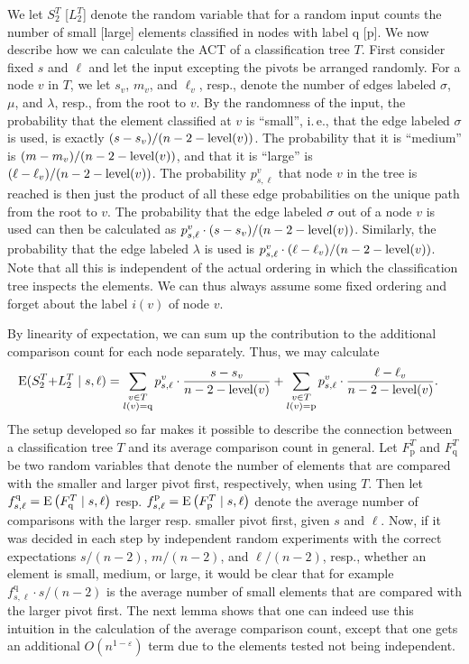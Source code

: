 \documentclass[prodmode,acmtalg]{acmsmall}
\newcommand{\E}{\textnormal{\textrm{E}}}
\begin{document}
We let $S^T_2$ [$L^T_2$] denote the random variable that for a random input
counts the number of small [large] elements classified in nodes with label
$\text{q}$ [$\text{p}$].  We now describe how we can calculate the ACT of a
classification tree $T$. First consider fixed $s$ and $\ell$ and let the input
excepting the pivots be arranged randomly.  For a node $v$ in $T$,  we let
$s_v$, $m_v$, and $\ell_v$, resp., denote the number of edges labeled $\sigma$,
$\mu$, and $\lambda$, resp., from the root to $v$. By the randomness of the
input, the probability that the element classified at $v$ is ``small'', i.\,e.,
that the edge labeled $\sigma$ is used,  is exactly $(s - s_v)/(n   - 2 -
\textnormal{\textrm{level}}(v))$. The probability that it is ``medium'' is $(m - m_v)/(n   - 2 -
\textnormal{\textrm{level}}(v))$, and that it is ``large'' is $(\ell - \ell_v)/(n - 2 - \textnormal{\textrm{level}}(v))$. The
probability $p^v_{s,\ell}$ that node $v$ in the tree is reached is then just
the product of all these edge probabilities on the unique path from the root to
$v$.  The probability that the edge labeled $\sigma$ out of a node $v$ is used
can then be calculated as $p^v_{s,\ell} \cdot (s - s_v)/(n   - 2 - \textnormal{\textrm{level}}(v))$.
Similarly, the probability that the edge labeled $\lambda$ is used is
$p^v_{s,\ell} \cdot (\ell - \ell_v)/(n   - 2 - \textnormal{\textrm{level}}(v))$. Note that all this is
independent of the actual ordering in which the classification tree inspects
the elements. We can thus always assume some fixed ordering and forget about
the label $i(v)$ of node $v$.
    
 By linearity of expectation, we can sum up the
    contribution to the additional comparison count for each node separately.
    Thus, we may calculate
   \begin{align}\label{eq:35}
    \E(S^T_2 {+} L^T_2 \mid s, \ell) &=\sum_{\substack{v \in T\\l(v) =
   \text{q}}} p^v_{s,\ell} \cdot 
\frac{s - s_v}{n
- 2 - \lv{v}} + \sum_{\substack{v \in T\\l(v) = \text{p}}} p^v_{s,\ell} \cdot \frac{\ell -
    \ell_v}{n - 2 -
    \lv{v}}.
    \end{align}
The setup developed so far makes it possible to describe the connection between a classification tree $T$ 
and its average comparison count in general. 
Let $F^T_{\text{p}}$ and $F^T_{\text{q}}$ be two random variables that denote the
number of elements that are compared
with the smaller and larger pivot first, respectively,  when using $T$. 
Then let $f^{\text{q}}_{s,\ell} = \E\left(F^T_{\text{q}} \mid s,\ell\right)$ resp. 
$f^{\text{p}}_{s,\ell} = \E\left(F^T_{\text{p}} \mid s,\ell\right)$ denote the average number of
comparisons with the larger resp. smaller pivot first, given $s$ and $\ell$. 
Now, if it was decided in each step by independent random experiments
with the correct expectations $s/(n-2)$, $m/(n-2)$, and $\ell/(n-2)$, resp.,
whether an element is small, medium, or large, it would be clear that for example $f^{\text{q}}_{s,\ell} \cdot s /
(n-2)$ is the average number of small elements that are compared with the larger pivot
first. The next lemma shows that one can indeed use this intuition in the
calculation of the average comparison count, except that one gets an additional $O(n^{1 - \varepsilon})$ term due to 
the elements tested not being independent. 
\end{document}
